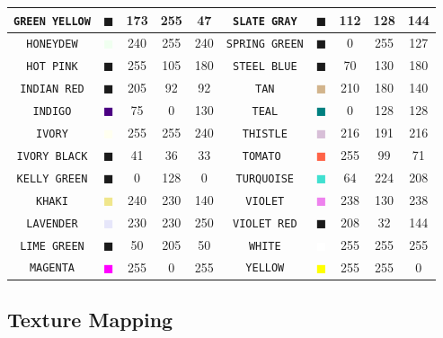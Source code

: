 \documentclass[11pt]{book}
\newcommand{\ct}{\tt\small}
\begin{document}
\begin{table}[p]
\begin{center}
\begin{tabular}{|c|c|c|c|c|c||c|c|c|c|}
{\ct GREEN YELLOW} & \textcolor{GREEN YELLOW} {$\blacksquare$} & 173& 255& 47& {\ct SLATE GRAY} &  \textcolor{SLATE GRAY} {$\blacksquare$} & 112& 128& 144  \\ \hline
{\ct HONEYDEW} & \textcolor{HONEYDEW} {$\blacksquare$} & 240& 255& 240& {\ct SPRING GREEN} &  \textcolor{SPRING GREEN} {$\blacksquare$} & 0& 255& 127  \\ \hline
{\ct HOT PINK} & \textcolor{HOT PINK} {$\blacksquare$} & 255& 105& 180& {\ct STEEL BLUE} &  \textcolor{STEEL BLUE} {$\blacksquare$} & 70& 130& 180  \\ \hline
{\ct INDIAN RED} & \textcolor{INDIAN RED} {$\blacksquare$} & 205& 92& 92& {\ct TAN} &  \textcolor{TAN} {$\blacksquare$} & 210& 180& 140  \\ \hline
{\ct INDIGO} & \textcolor{INDIGO} {$\blacksquare$} & 75& 0& 130& {\ct TEAL} &  \textcolor{TEAL} {$\blacksquare$} & 0& 128& 128  \\ \hline
{\ct IVORY} & \textcolor{IVORY} {$\blacksquare$} & 255& 255& 240& {\ct THISTLE} &  \textcolor{THISTLE} {$\blacksquare$} & 216& 191& 216  \\ \hline
{\ct IVORY BLACK} & \textcolor{IVORY BLACK} {$\blacksquare$} & 41& 36& 33& {\ct TOMATO } &  \textcolor{TOMATO } {$\blacksquare$} & 255& 99& 71  \\ \hline
{\ct KELLY GREEN} & \textcolor{KELLY GREEN} {$\blacksquare$} & 0& 128& 0& {\ct TURQUOISE} &  \textcolor{TURQUOISE} {$\blacksquare$} & 64& 224& 208  \\ \hline
{\ct KHAKI} & \textcolor{KHAKI} {$\blacksquare$} & 240& 230& 140& {\ct VIOLET} &  \textcolor{VIOLET} {$\blacksquare$} & 238& 130& 238  \\ \hline
{\ct LAVENDER} & \textcolor{LAVENDER} {$\blacksquare$} & 230& 230& 250& {\ct VIOLET RED} &  \textcolor{VIOLET RED} {$\blacksquare$} & 208& 32& 144  \\ \hline
{\ct LIME GREEN} & \textcolor{LIME GREEN} {$\blacksquare$} & 50& 205& 50& {\ct WHITE} &  \textcolor{WHITE} {$\blacksquare$} & 255& 255& 255  \\ \hline
{\ct MAGENTA} & \textcolor{MAGENTA} {$\blacksquare$} & 255& 0& 255& {\ct YELLOW} &  \textcolor{YELLOW} {$\blacksquare$} & 255& 255& 0  \\ \hline
\hline
\end{tabular}
\end{center}
\end{table}


\subsection{Texture Mapping}
\label{info:texture_map}
\end{document}
